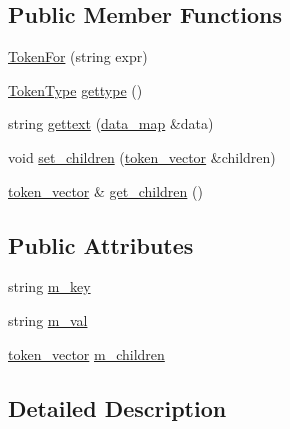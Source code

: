 \subsection*{Public Member Functions}
\begin{DoxyCompactItemize}
\item 
\hyperlink{classxtd_1_1network_1_1http_1_1cpptempl_1_1TokenFor_a536e770283d1ce5e433ad069febdd592}{Token\-For} (string expr)
\item 
\hyperlink{namespacextd_1_1network_1_1http_1_1cpptempl_a39833083d228a5b5ef9f6bb7896479ee}{Token\-Type} \hyperlink{classxtd_1_1network_1_1http_1_1cpptempl_1_1TokenFor_a6901a6f0d625a48ae1ca6abc5b5b4d9e}{gettype} ()
\item 
string \hyperlink{classxtd_1_1network_1_1http_1_1cpptempl_1_1TokenFor_a27dde182755e5a44c3d11f1a1ed9aa65}{gettext} (\hyperlink{namespacextd_1_1network_1_1http_1_1cpptempl_a638d1d81c8fb63c0bbafd508d6a2a007}{data\-\_\-map} \&data)
\item 
void \hyperlink{classxtd_1_1network_1_1http_1_1cpptempl_1_1TokenFor_a8256ae71e4f40e1e84426e837b4090ef}{set\-\_\-children} (\hyperlink{namespacextd_1_1network_1_1http_1_1cpptempl_a38606cfbbfe81ed46ea9b0cf064de956}{token\-\_\-vector} \&children)
\item 
\hyperlink{namespacextd_1_1network_1_1http_1_1cpptempl_a38606cfbbfe81ed46ea9b0cf064de956}{token\-\_\-vector} \& \hyperlink{classxtd_1_1network_1_1http_1_1cpptempl_1_1TokenFor_ab742d87d8aea8968ebb3403333ec021e}{get\-\_\-children} ()
\end{DoxyCompactItemize}
\subsection*{Public Attributes}
\begin{DoxyCompactItemize}
\item 
string \hyperlink{classxtd_1_1network_1_1http_1_1cpptempl_1_1TokenFor_a30879f48f3ad6e5e61f6191a702743e4}{m\-\_\-key}
\item 
string \hyperlink{classxtd_1_1network_1_1http_1_1cpptempl_1_1TokenFor_a262fbad437a0b5aeed05a73c315f865b}{m\-\_\-val}
\item 
\hyperlink{namespacextd_1_1network_1_1http_1_1cpptempl_a38606cfbbfe81ed46ea9b0cf064de956}{token\-\_\-vector} \hyperlink{classxtd_1_1network_1_1http_1_1cpptempl_1_1TokenFor_a2ee55240eafb3c90b7a0c96c0ad253a5}{m\-\_\-children}
\end{DoxyCompactItemize}


\subsection{Detailed Description}


